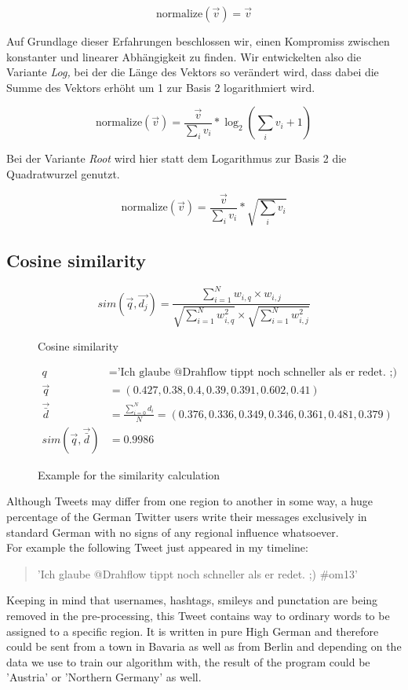 \documentclass[../Main.tex]{subfiles}
\begin{document}
$$\text{normalize}(\vec v) = \vec v$$

Auf Grundlage dieser Erfahrungen beschlossen wir, einen Kompromiss zwischen konstanter und linearer Abhängigkeit zu finden. Wir entwickelten also die Variante \textit{Log,} bei der die Länge des Vektors so verändert wird, dass dabei die Summe des Vektors erhöht um 1 zur Basis 2 logarithmiert wird.

$$\text{normalize}(\vec v) = \frac{\vec v}{\sum_i v_i} * \log_2(\sum_i v_i+1)$$

Bei der Variante \textit{Root} wird hier statt dem Logarithmus zur Basis 2 die Quadratwurzel genutzt.

$$\text{normalize}(\vec v) = \frac{\vec v}{\sum_i v_i} * \sqrt{\sum_i v_i}$$

\subsection{Cosine similarity}
\begin{figure}
  \[ sim(\vec{q},\vec{d_j}) = \frac{\sum^N_{i=1} w_{i,q} \times w_{i,j}}{\sqrt{\sum^N_{i=1}w^2_{i,q}} \times \sqrt{\sum^N_{i=1}w^2_{i,j}}} \]
  \caption{Cosine similarity}
  \label{cos_sim}
\end{figure}
\begin{figure}
 \begin{align*}
  q &= \textrm{'Ich glaube @Drahflow tippt noch schneller als er redet. ;) \#om13' } \\
  \vec{q} &= (0.427, 0.38, 0.4, 0.39, 0.391, 0.602,  0.41) \\ 
   \vec{\bar{d}} &= \frac{\sum^N_{i=0} d_i}{N} =  (0.376, 0.336, 0.349, 0.346, 0.361, 0.481,  0.379) \\
  sim(\vec{q}, \vec{\bar{d}}) &= 0.9986 
\end{align*}
  \caption{Example for the similarity calculation}
  \label{cos_sim_example}
\end{figure}
Although Tweets may differ from one region to another in some way, a huge percentage of the German Twitter users write their messages exclusively in standard German with no signs of any regional influence whatsoever.  \\
For example the following Tweet just appeared in my timeline:
\begin{quote}
'Ich glaube @Drahflow tippt noch schneller als er redet. ;) \#om13'
\end{quote}
Keeping in mind that  usernames, hashtags, smileys and punctation are being removed in the pre-processing, this Tweet contains way to ordinary words to be assigned to a specific region. It is written in pure High German and therefore could be sent from a town in Bavaria as well as from Berlin and depending on the data we use to train our algorithm with, the result of the program could be 'Austria' or 'Northern Germany' as well.
\end{document}
